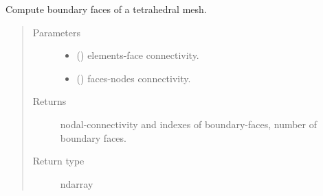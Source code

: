 \documentclass[letterpaper,10pt,english]{sphinxmanual}
\begin{document}
\begin{fulllineitems}
\label{\detokenize{petgem/mesh:petgem.mesh.computeBoundaryFaces}}
Compute boundary faces of a tetrahedral mesh.
\begin{quote}\begin{description}
\item[{Parameters}] \leavevmode\begin{itemize}
\item {} 
 () \textendash{} elements-face connectivity.

\item {} 
 () \textendash{} faces-nodes connectivity.

\end{itemize}

\item[{Returns}] \leavevmode
nodal-connectivity and indexes of boundary-faces, number of boundary faces.

\item[{Return type}] \leavevmode
ndarray

\end{description}\end{quote}

\end{fulllineitems}

\end{document}
